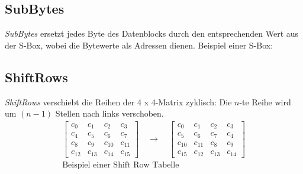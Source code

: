 \subsection{SubBytes}
\textit{SubBytes} ersetzt jedes Byte des Datenblocks durch den entsprechenden Wert aus der S-Box, wobei die Bytewerte als Adressen dienen. Beispiel einer S-Box:
\begin{table}[H]
    \caption{Beispiel einer S-Box im AES-Algorithmus}
\end{table}

\subsection{ShiftRows}
\textit{ShiftRows} verschiebt die Reihen der 4 x 4-Matrix zyklisch: Die $n$-te Reihe wird um $(n-1)$ Stellen nach links verschoben.
\[
\begin{array}{c}
\begin{bmatrix}
c_0  & c_1  & c_2  & c_3  \\
c_4  & c_5  & c_6  & c_7  \\
c_8  & c_9  & c_{10} & c_{11} \\
c_{12} & c_{13} & c_{14} & c_{15}
\end{bmatrix}
\quad\rightarrow\quad
\begin{bmatrix}
c_0  & c_1  & c_2  & c_3  \\
c_5  & c_6  & c_7  & c_4  \\
c_{10} & c_{11} & c_8  & c_9  \\
c_{15} & c_{12} & c_{13} & c_{14}
\end{bmatrix}\\
\text{Beispiel einer Shift Row Tabelle}
\end{array}
\]

